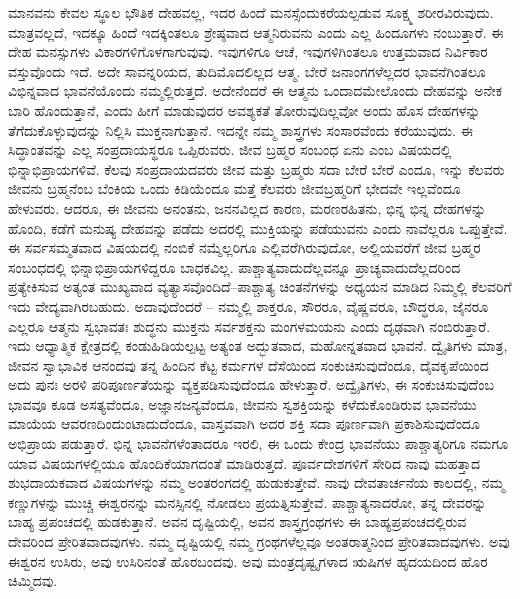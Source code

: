 ಮಾನವನು ಕೇವಲ ಸ್ಥೂಲ ಭೌತಿಕ ದೇಹವಲ್ಲ, ಇದರ ಹಿಂದೆ ಮನಸ್ಸೆಂದು\break ಕರೆಯಲ್ಪಡುವ ಸೂಕ್ಷ್ಮ ಶರೀರವಿರುವುದು. ಮಾತ್ರವಲ್ಲದೆ, ಇದಕ್ಕೂ ಹಿಂದೆ ಇದಕ್ಕಿಂತಲೂ ಶ್ರೇಷ್ಠವಾದ ಆತ್ಮನಿರುವನು ಎಂದು ಎಲ್ಲ ಹಿಂದೂಗಳು ನಂಬುತ್ತಾರೆ. ಈ ದೇಹ ಮನಸ್ಸುಗಳು ವಿಕಾರಗಳಿಗೊಳಗಾಗುವುವು. ಇವುಗಳಿಗೂ ಆಚೆ, ಇವುಗಳಿಗಿಂತಲೂ ಉತ್ತಮವಾದ ನಿರ್ವಿಕಾರ ವಸ್ತುವೊಂದು ಇದೆ. ಅದೇ ಸಾವನ್ನರಿಯದ, ತುದಿಮೊದಲಿಲ್ಲದ ಆತ್ಮ. ಬೇರೆ ಜನಾಂಗಗಳೆಲ್ಲದರ ಭಾವನೆಗಿಂತಲೂ ವಿಭಿನ್ನವಾದ ಭಾವನೆಯೊಂದು ನಮ್ಮಲ್ಲಿರುತ್ತದೆ. ಅದೇನೆಂದರೆ ಈ ಆತ್ಮನು ಒಂದಾದಮೇಲೊಂದು ದೇಹವನ್ನು ಅನೇಕ ಬಾರಿ ಹೊಂದುತ್ತಾನೆ, ಎಂದು ಹೀಗೆ ಮಾಡುವುದರ ಅವಶ್ಯಕತೆ ತೋರುವುದಿಲ್ಲವೋ ಅಂದು ಹೊಸ ದೇಹಗಳನ್ನು ತೆಗೆದುಕೊಳ್ಳುವುದನ್ನು ನಿಲ್ಲಿಸಿ ಮುಕ್ತನಾಗುತ್ತಾನೆ. ಇದನ್ನೇ ನಮ್ಮ ಶಾಸ್ತ್ರಗಳು ಸಂಸಾರವೆಂದು ಕರೆಯುವುದು. ಈ ಸಿದ್ಧಾಂತವನ್ನು ಎಲ್ಲ ಸಂಪ್ರದಾಯಸ್ಥರೂ ಒಪ್ಪಿರುವರು. ಜೀವ ಬ್ರಹ್ಮರ ಸಂಬಂಧ ಏನು ಎಂಬ ವಿಷಯದಲ್ಲಿ ಭಿನ್ನಾಭಿಪ್ರಾಯಗಳಿವೆ. ಕೆಲವು ಸಂಪ್ರದಾಯದವರು ಜೀವ ಮತ್ತು ಬ್ರಹ್ಮರು ಸದಾ ಬೇರೆ ಬೇರೆ ಎಂದೂ, ಇನ್ನು ಕೆಲವರು ಜೀವನು ಬ್ರಹ್ಮನೆಂಬ ಬೆಂಕಿಯ ಒಂದು ಕಿಡಿಯೆಂದೂ ಮತ್ತೆ ಕೆಲವರು ಜೀವಬ್ರಹ್ಮರಿಗೆ ಭೇದವೇ ಇಲ್ಲವೆಂದೂ ಹೇಳುವರು. ಆದರೂ, ಈ ಜೀವನು ಅನಂತನು, ಜನನವಿಲ್ಲದ ಕಾರಣ, ಮರಣರಹಿತನು, ಭಿನ್ನ ಭಿನ್ನ ದೇಹಗಳನ್ನು ಹೊಂದಿ, ಕಡೆಗೆ ಮನುಷ್ಯ ದೇಹವನ್ನು ಪಡೆದು ಅದರಲ್ಲಿ ಮುಕ್ತಿಯನ್ನು ಪಡೆಯುವನು ಎಂದು ನಾವೆಲ್ಲರೂ ಒಪ್ಪುತ್ತೇವೆ. ಈ ಸರ್ವಸಮ್ಮತವಾದ ವಿಷಯದಲ್ಲಿ ನಂಬಿಕೆ ನಮ್ಮೆಲ್ಲರಿಗೂ ಎಲ್ಲಿವರೆಗಿರುವುದೋ, ಅಲ್ಲಿಯವರೆಗೆ ಜೀವ ಬ್ರಹ್ಮರ ಸಂಬಂಧದಲ್ಲಿ ಭಿನ್ನಾಭಿಪ್ರಾಯಗಳಿದ್ದರೂ ಬಾಧಕವಿಲ್ಲ. ಪಾಶ್ಚಾತ್ಯವಾದುದೆಲ್ಲವನ್ನೂ ಪ್ರಾಚ್ಯವಾದುದೆಲ್ಲದರಿಂದ ಪ್ರತ್ಯೇಕಿಸುವ ಅತ್ಯಂತ ಮುಖ್ಯವಾದ ವ್ಯತ್ಯಾಸವೊಂದಿದೆ–ಪಾಶ್ಚಾತ್ಯ ಚಿಂತನೆಗಳನ್ನು ಅಧ್ಯಯನ ಮಾಡಿದ ನಿಮ್ಮಲ್ಲಿ ಕೆಲವರಿಗೆ ಇದು ವೇದ್ಯವಾಗಿರಬಹುದು. ಅದಾವುದೆಂದರೆ – ನಮ್ಮಲ್ಲಿ ಶಾಕ್ತರೂ, ಸೌರರೂ, ವೈಷ್ಣವರೂ, ಬೌದ್ಧರೂ, ಜೈನರೂ ಎಲ್ಲರೂ ಆತ್ಮನು ಸ್ವಭಾವತಃ ಶುದ್ಧನು ಮುಕ್ತನು ಸರ್ವಶಕ್ತನು ಮಂಗಳಮಯನು ಎಂದು ದೃಢವಾಗಿ ನಂಬಿರುತ್ತಾರೆ. ಇದು ಆಧ್ಯಾತ್ಮಿಕ ಕ್ಷೇತ್ರದಲ್ಲಿ ಕಂಡುಹಿಡಿಯಲ್ಪಟ್ಟ ಅತ್ಯಂತ ಅದ್ಭುತವಾದ, ಮಹೋನ್ನತವಾದ ಭಾವನೆ. ದ್ವೈತಿಗಳು ಮಾತ್ರ, ಜೀವನ ಸ್ವಾಭಾವಿಕ ಆನಂದವು ತನ್ನ ಹಿಂದಿನ ಕೆಟ್ಟ ಕರ್ಮಗಳ ದೆಸೆಯಿಂದ ಸಂಕುಚಿಸುವುದೆಂದೂ, ದೈವಕೃಪೆಯಿಂದ ಅದು ಪುನಃ ಅರಳಿ ಪರಿಪೂರ್ಣತೆಯನ್ನು ವ್ಯಕ್ತಪಡಿಸುವುದೆಂದೂ ಹೇಳುತ್ತಾರೆ. ಅದ್ವೈತಿಗಳು, ಈ ಸಂಕುಚಿಸುವುದೆಂಬ ಭಾವವೂ ಕೂಡ ಅಸತ್ಯವೆಂದೂ, ಅಜ್ಞಾನಜನ್ಯವೆಂದೂ, ಜೀವನು ಸ್ವಶಕ್ತಿಯನ್ನು ಕಳೆದುಕೊಂಡಿರುವ ಭಾವನೆಯು ಮಾಯೆಯ ಆವರಣದಿಂದುಂಟಾದುದೆಂದೂ, ವಾಸ್ತವವಾಗಿ ಅದರ ಶಕ್ತಿ ಸದಾ ಪೂರ್ಣವಾಗಿ ಪ್ರಕಾಶಿಸುವುದೆಂದೂ ಅಭಿಪ್ರಾಯ ಪಡುತ್ತಾರೆ. ಭಿನ್ನ ಭಾವನೆಗಳೆಂತಾದರೂ ಇರಲಿ, ಈ ಒಂದು ಕೇಂದ್ರ ಭಾವನೆಯು ಪಾಶ್ಚಾತ್ಯರಿಗೂ ನಮಗೂ ಯಾವ ವಿಷಯಗಳಲ್ಲಿಯೂ ಹೊಂದಿಕೆಯಾಗದಂತೆ ಮಾಡಿರುತ್ತದೆ. ಪೂರ್ವದೇಶಗಳಿಗೆ ಸೇರಿದ ನಾವು ಮಹತ್ತಾದ ಶುಭದಾಯಕವಾದ ವಿಷಯಗಳನ್ನು ನಮ್ಮ ಅಂತರಂಗದಲ್ಲಿ ಹುಡುಕುತ್ತೇವೆ. ನಾವು ದೇವತಾರ್ಚನೆಯ ಕಾಲದಲ್ಲಿ, ನಮ್ಮ ಕಣ್ಣುಗಳನ್ನು ಮುಚ್ಚಿ ಈಶ್ವರನನ್ನು ಮನಸ್ಸಿನಲ್ಲಿ ನೋಡಲು ಪ್ರಯತ್ನಿಸುತ್ತೇವೆ. ಪಾಶ್ಚಾತ್ಯನಾದರೋ, ತನ್ನ ದೇವರನ್ನು ಬಾಹ್ಯ ಪ್ರಪಂಚದಲ್ಲಿ ಹುಡಕುತ್ತಾನೆ. ಅವನ ದೃಷ್ಟಿಯಲ್ಲಿ, ಅವನ ಶಾಸ್ತ್ರಗ್ರಂಥಗಳು ಈ ಬಾಹ್ಯಪ್ರಪಂಚದಲ್ಲಿರುವ ದೇವರಿಂದ ಪ್ರೇರಿತವಾದವುಗಳು. ನಮ್ಮ ದೃಷ್ಟಿಯಲ್ಲಿ ನಮ್ಮ ಗ್ರಂಥಗಳೆಲ್ಲವೂ ಅಂತರಾತ್ಮನಿಂದ ಪ್ರೇರಿತವಾದವುಗಳು. ಅವು ಈಶ್ವರನ ಉಸಿರು, ಅವು ಉಸಿರಿನಂತೆ ಹೊರಬಂದವು. ಅವು ಮಂತ್ರದೃಷ್ಟೃಗಳಾದ ಋಷಿಗಳ ಹೃದಯದಿಂದ ಹೊರ ಚಿಮ್ಮಿದವು.

